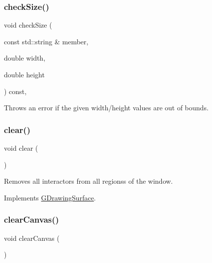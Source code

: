 \subsubsection{\texorpdfstring{check\+Size()}{checkSize()}}
{\footnotesize\ttfamily void check\+Size (\begin{DoxyParamCaption}\item[{const std\+::string \&}]{member,  }\item[{double}]{width,  }\item[{double}]{height }\end{DoxyParamCaption}) const\hspace{0.3cm}{\ttfamily [protected]}, {\ttfamily [inherited]}}



Throws an error if the given width/height values are out of bounds. 

\mbox{\label{classGWindow_af220cadd1499c3586d48010a0348d9f8}} 
\subsubsection{\texorpdfstring{clear()}{clear()}}
{\footnotesize\ttfamily void clear (\begin{DoxyParamCaption}{ }\end{DoxyParamCaption})\hspace{0.3cm}{\ttfamily [virtual]}}



Removes all interactors from all regionss of the window. 



Implements \mbox{\hyperlink{classGDrawingSurface_a5eeb94d22b8366d1b68d0614384802fe}{G\+Drawing\+Surface}}.

\mbox{\label{classGWindow_a8c64b6dc10f111538780ddca425a1693}} 
\subsubsection{\texorpdfstring{clear\+Canvas()}{clearCanvas()}}
{\footnotesize\ttfamily void clear\+Canvas (\begin{DoxyParamCaption}{ }\end{DoxyParamCaption})\hspace{0.3cm}{\ttfamily [virtual]}}



